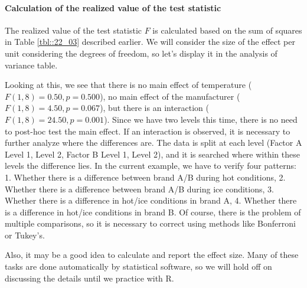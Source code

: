 \documentclass{ltjsarticle}
\begin{document}
\paragraph{Calculation of the realized value of the test statistic} The realized value of the test statistic $F$ is calculated based on the sum of squares in Table \ref{tbl::22_03} described earlier. We will consider the size of the effect per unit considering the degrees of freedom, so let's display it in the analysis of variance table.

Looking at this, we see that there is no main effect of temperature ($F(1,8) = 0.50, p = 0.500$), no main effect of the manufacturer ($F(1,8) = 4.50, p = 0.067$), but there is an interaction ($F(1,8) = 24.50, p = 0.001$). Since we have two levels this time, there is no need to post-hoc test the main effect. If an interaction is observed, it is necessary to further analyze where the differences are. The data is split at each level (Factor A Level 1, Level 2, Factor B Level 1, Level 2), and it is searched where within these levels the difference lies. In the current example, we have to verify four patterns: 1. Whether there is a difference between brand A/B during hot conditions, 2. Whether there is a difference between brand A/B during ice conditions, 3. Whether there is a difference in hot/ice conditions in brand A, 4. Whether there is a difference in hot/ice conditions in brand B. Of course, there is the problem of multiple comparisons, so it is necessary to correct using methods like Bonferroni or Tukey's.

Also, it may be a good idea to calculate and report the effect size. Many of these tasks are done automatically by statistical software, so we will hold off on discussing the details until we practice with R.
\end{document}
